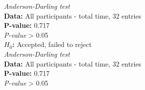 \begin{framed}{\noindent\centering
\textit{Anderson-Darling test} \\
\textbf{Data:} All participants - total time, 32 entries\\
  \textbf{P-value:} 0.717  \\
    \textit{P-value} > 0.05\\
  \textbf{$H_{0}$:} Accepted, failed to reject \\
  \textit{Anderson-Darling test} \\
  \textbf{Data:} All participants - total time, 32 entries\\
  \textbf{P-value:} 0.717  \\
  \textit{P-value} > 0.05
  \par}
\end{framed}



